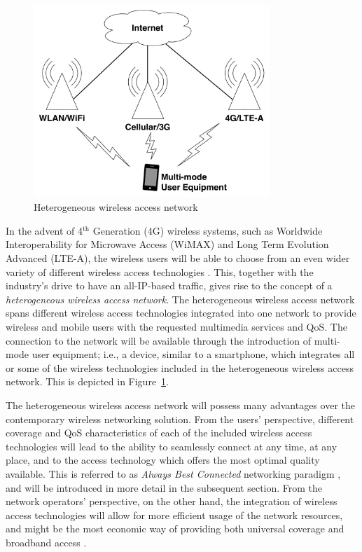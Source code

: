 \begin{figure}[t]
    \centering
    \includegraphics[width=3.5in]{Intelligent/Figures/heterogeneous}
    \caption{Heterogeneous wireless access network}
    \label{fig:heterogeneous_intelligent}
\end{figure}

In the advent of 4$^{\text{th}}$ Generation (4G) wireless systems, such as Worldwide Interoperability for Microwave Access (WiMAX) and Long Term Evolution Advanced (LTE-A), the wireless users will be able to choose from an even wider variety of different wireless access technologies \cite{HossainBeaubrun09, HossainTalebiFard09}. This, together with the industry's drive to have an all-IP-based traffic, gives rise to the concept of a \emph{heterogeneous wireless access network}. The heterogeneous wireless access network spans different wireless access technologies integrated into one network to provide wireless and mobile users with the requested multimedia services and QoS. The connection to the network will be available through the introduction of multi-mode user equipment; i.e., a device, similar to a smartphone, which integrates all or some of the wireless technologies included in the heterogeneous wireless access network. This is depicted in Figure~\ref{fig:heterogeneous_intelligent}.

The heterogeneous wireless access network will possess many advantages over the contemporary wireless networking solution. From the users' perspective, different coverage and QoS characteristics of each of the included wireless access technologies will lead to the ability to seamlessly connect at any time, at any place, and to the access technology which offers the most optimal quality available. This is referred to as \emph{Always Best Connected} networking paradigm \cite{ABC03}, and will be introduced in more detail in the subsequent section. From the network operators' perspective, on the other hand, the integration of wireless access technologies will allow for more efficient usage of the network resources, and might be the most economic way of providing both universal coverage and broadband access \cite{HossainBeaubrun09}.

